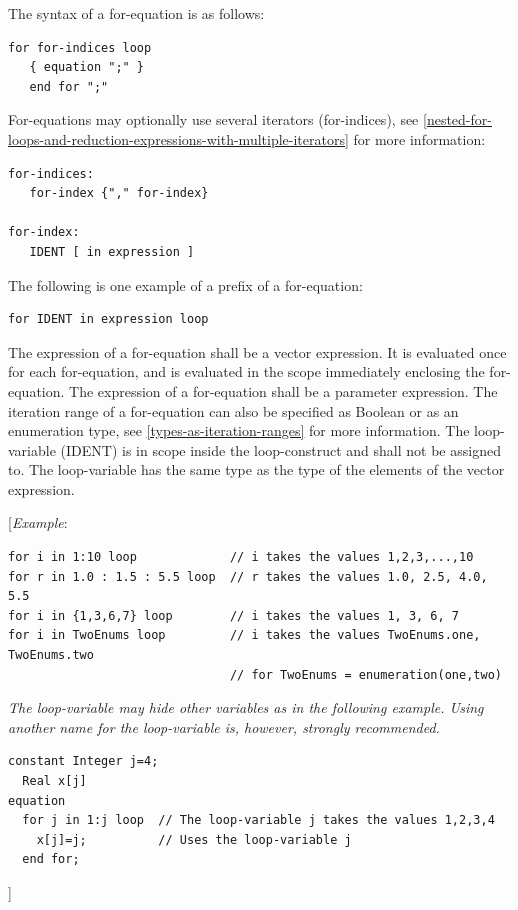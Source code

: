 \documentclass[10pt,a4paper]{report}
\begin{document}
The syntax of a for-equation is as follows:
\begin{lstlisting}[language=grammar]
for for-indices loop
   { equation ";" } 
   end for ";" 
\end{lstlisting}

For-equations may optionally use several iterators (for-indices), see
\ref{nested-for-loops-and-reduction-expressions-with-multiple-iterators} for more information:
\begin{lstlisting}[language=grammar]
for-indices:    
   for-index {"," for-index} 
 
for-index:    
   IDENT [ in expression ] 
\end{lstlisting}


The following is one example of a prefix of a for-equation:
\begin{lstlisting}[language=grammar]
for IDENT in expression loop
\end{lstlisting}

The expression of a for-equation shall be a vector expression. It is
evaluated once for each for-equation, and is evaluated in the scope
immediately enclosing the for-equation. The expression of a for-equation
shall be a parameter expression. The iteration range of a for-equation
can also be specified as Boolean or as an enumeration type, see 
\ref{types-as-iteration-ranges} for more information. The loop-variable (IDENT) is in scope
inside the loop-construct and shall not be assigned to. The
loop-variable has the same type as the type of the elements of the
vector expression.

{[}\emph{Example}:
\begin{lstlisting}[language=modelica]
for i in 1:10 loop             // i takes the values 1,2,3,...,10 
for r in 1.0 : 1.5 : 5.5 loop  // r takes the values 1.0, 2.5, 4.0, 5.5 
for i in {1,3,6,7} loop        // i takes the values 1, 3, 6, 7 
for i in TwoEnums loop         // i takes the values TwoEnums.one, TwoEnums.two                                
                               // for TwoEnums = enumeration(one,two)
\end{lstlisting}

\emph{The loop-variable may hide other variables as in the following
example. Using another name for the loop-variable is, however, strongly
recommended.}

\begin{lstlisting}[language=modelica]
  constant Integer j=4;
  Real x[j]
equation   
  for j in 1:j loop  // The loop-variable j takes the values 1,2,3,4     
    x[j]=j;          // Uses the loop-variable j   
  end for;
\end{lstlisting}
{]}
\end{document}
